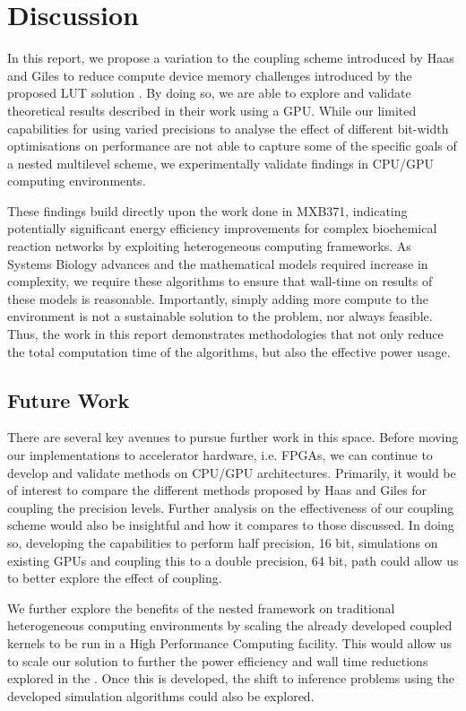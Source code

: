 \section{Discussion}
In this report, we propose a variation to the coupling scheme introduced by Haas and Giles to reduce compute device memory challenges introduced by the proposed LUT solution \cite{haasNestedMLMCFramework2025a}. By doing so, we are able to explore and validate theoretical results described in their work using a GPU. While our limited capabilities for using varied precisions to analyse the effect of different bit-width optimisations on performance are not able to capture some of the specific goals of a nested multilevel scheme, we experimentally validate findings in CPU/GPU computing environments. 

These findings build directly upon the work done in MXB371, indicating potentially significant energy efficiency improvements for complex biochemical reaction networks by exploiting heterogeneous computing frameworks. As Systems Biology advances and the mathematical models required increase in complexity, we require these algorithms to ensure that wall-time on results of these models is reasonable. Importantly, simply adding more compute to the environment is not a sustainable solution to the problem, nor always feasible. Thus, the work in this report demonstrates methodologies that not only reduce the total computation time of the algorithms, but also the effective power usage. 

\subsection{Future Work}
There are several key avenues to pursue further work in this space. Before moving our implementations to accelerator hardware, i.e. FPGAs, we can continue to develop and validate methods on CPU/GPU architectures. Primarily, it would be of interest to compare the different methods proposed by Haas and Giles for coupling the precision levels. Further analysis on the effectiveness of our coupling scheme would also be insightful and how it compares to those discussed. In doing so, developing the capabilities to perform half precision, 16 bit, simulations on existing GPUs and coupling this to a double precision, 64 bit, path could allow us to better explore the effect of coupling. 

We further explore the benefits of the nested framework on traditional heterogeneous computing environments by scaling the already developed coupled kernels to be run in a High Performance Computing facility. This would allow us to scale our solution to further the power efficiency and wall time reductions explored in the . Once this is developed, the shift to inference problems using the developed simulation algorithms could also be explored. 

